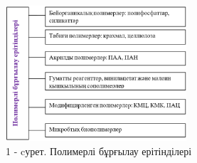 \begin{figure}[H]
	\centering
	\includegraphics[width=0.6\textwidth]{media/gorn4/image3}
	\caption*{1 - cурет. Полимерлі бұрғылау ерітінділері}
\end{figure}

